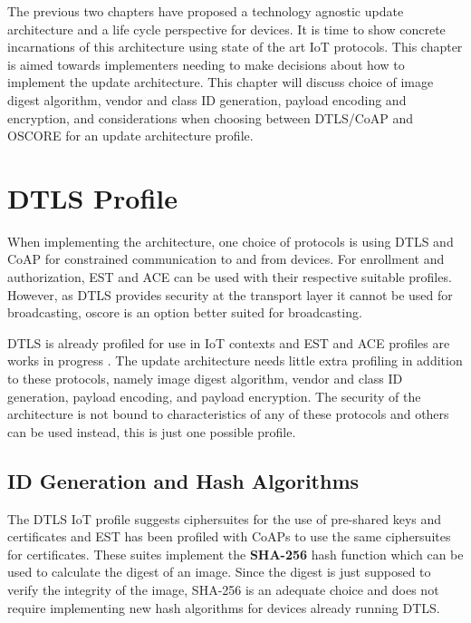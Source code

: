 \documentclass[0-thesis.tex]{subfiles}
\begin{document}
\label{chap:profiles}
The previous two chapters have proposed a technology agnostic update architecture and a
life cycle perspective for devices. It is time to show concrete incarnations of this
architecture using state of the art IoT protocols. This chapter is aimed towards
implementers needing to make decisions about how to implement the update architecture.
This chapter will discuss choice of image digest algorithm, vendor and class ID
generation, payload encoding and encryption, and considerations when choosing between
DTLS/CoAP and OSCORE for an update architecture profile.

\section{DTLS Profile}
\label{sec:dtls-profile}
When implementing the architecture, one choice of protocols is using DTLS and CoAP for
constrained communication to and from devices. For enrollment and authorization, EST and
ACE can be used with their respective suitable profiles. However, as DTLS provides
security at the transport layer it cannot be used for broadcasting, \gls{oscore} is an
option better suited for broadcasting. 

DTLS is already profiled for use in IoT contexts and EST and ACE profiles are works in
progress \parencite{rfc7925, est-coaps, ace-dtls-profile}. The update architecture needs
little extra profiling in addition to these protocols, namely image digest algorithm,
vendor and class ID generation, payload encoding, and payload encryption. The security of
the architecture is not bound to characteristics of any of these protocols and others can
be used instead, this is just one possible profile.


\subsection{ID Generation and Hash Algorithms}
\label{ssec:hash-id-algorithm}
The DTLS IoT profile suggests ciphersuites for the use of pre-shared keys and certificates
and EST has been profiled with CoAPs to use the same ciphersuites for certificates. These
suites implement the \textbf{SHA-256} hash function which can be used to calculate the
digest of an image. Since the digest is just supposed to verify the integrity of the
image, SHA-256 is an adequate choice and does not require implementing new hash algorithms
for devices already running DTLS.
\end{document}
